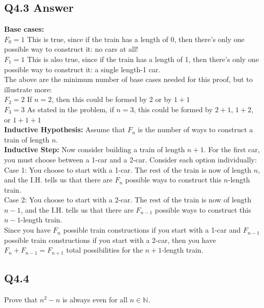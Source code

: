 \documentclass{article}
\begin{document}
\subsection*{Q4.3 Answer}
\textbf{Base cases:}
\\ $F_0=1$ This is true, since if the train has a length of 0, then there's only one possible way to construct it: no cars at all!
\\ $F_1=1$ This is also true, since if the train has a length of 1, then there's only one possible way to construct it: a single length-1 car.
\\ The above are the minimum number of base cases needed for this proof, but to illustrate more:
\\ $F_2=2$ If $n=2$, then this could be formed by $2$ or by $1+1$
\\ $F_3=3$ As stated in the problem, if $n=3$, this could be formed by $2+1$, $1+2$, or $1+1+1$
\\ \textbf{Inductive Hypothesis:} Assume that $F_n$ is the number of ways to construct a train of length $n$.
\\ \textbf{Inductive Step:} Now consider building a train of length $n+1$. For the first car, you must choose between a 1-car and a 2-car. Consider each option individually:
\\ Case 1: You choose to start with a 1-car. The rest of the train is now of length $n$, and the I.H. tells us that there are $F_n$ possible ways to construct this $n$-length train.
\\ Case 2: You choose to start with a 2-car. The rest of the train is now of length $n-1$, and the I.H. tells us that there are $F_{n-1}$ possible ways to construct this $n-1$-length train.
\\ Since you have $F_n$ possible train constructions if you start with a 1-car and $F_{n-1}$ possible train constructions if you start with a 2-car, then you have $F_n+F_{n-1}=F_{n+1}$ total possibilities for the $n+1$-length train.
\newpage

\subsection*{Q4.4}
Prove that $n^2-n$ is always even for all $n\in\mathbb{N}$.
\newpage
\end{document}
